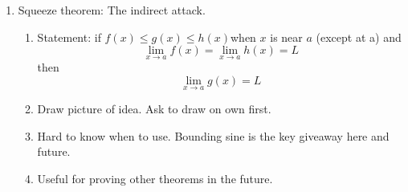 \documentclass{article}
\begin{document}
\begin{enumerate}
\item Squeeze theorem: The indirect attack.
\begin{enumerate}
\item Statement: if $f(x)\leq g(x)\leq h(x)$when $x$ is near $a$ (except at a) and
$$
\lim_{x\rightarrow a}f(x) = \lim_{x\rightarrow a}h(x) = L
$$
then 
$$
\lim_{x\rightarrow a} g(x) = L
$$
\item Draw picture of idea. Ask to draw on own first.
\item Hard to know when to use. Bounding sine is the key giveaway here and future.
\item Useful for proving other theorems in the future.
\end{enumerate}

\end{enumerate}


\end{document}
